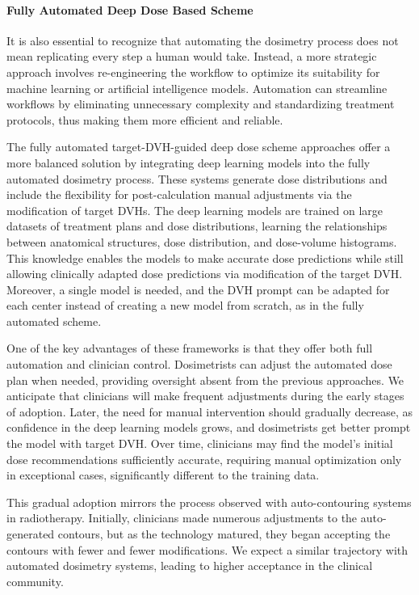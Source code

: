 \paragraph{Fully Automated Deep Dose Based Scheme}
It is also essential to recognize that automating the dosimetry process does not mean replicating every step a human would take.
Instead, a more strategic approach involves re-engineering the workflow to optimize its suitability for machine learning or artificial intelligence models.
Automation can streamline workflows by eliminating unnecessary complexity and standardizing treatment protocols, thus making them more efficient and reliable.

The fully automated target-DVH-guided deep dose scheme approaches offer a more balanced solution by integrating deep learning models into the fully automated dosimetry process.
These systems generate dose distributions and include the flexibility for post-calculation manual adjustments via the modification of target DVHs.
The deep learning models are trained on large datasets of treatment plans and dose distributions, learning the relationships between anatomical structures, dose distribution, and dose-volume histograms.
This knowledge enables the models to make accurate dose predictions while still allowing clinically adapted dose predictions via modification of the target DVH.
Moreover, a single model is needed, and the DVH prompt can be adapted for each center instead of creating a new model from scratch, as in the fully automated scheme.

One of the key advantages of these frameworks is that they offer both full automation and clinician control.
Dosimetrists can adjust the automated dose plan when needed, providing oversight absent from the previous approaches.
We anticipate that clinicians will make frequent adjustments during the early stages of adoption.
Later, the need for manual intervention should gradually decrease, as confidence in the deep learning models grows, and dosimetrists get better prompt the model with target DVH.
Over time, clinicians may find the model's initial dose recommendations sufficiently accurate, requiring manual optimization only in exceptional cases, significantly different to the training data.

This gradual adoption mirrors the process observed with auto-contouring systems in radiotherapy.
Initially, clinicians made numerous adjustments to the auto-generated contours, but as the technology matured, they began accepting the contours with fewer and fewer modifications.
We expect a similar trajectory with automated dosimetry systems, leading to higher acceptance in the clinical community.

